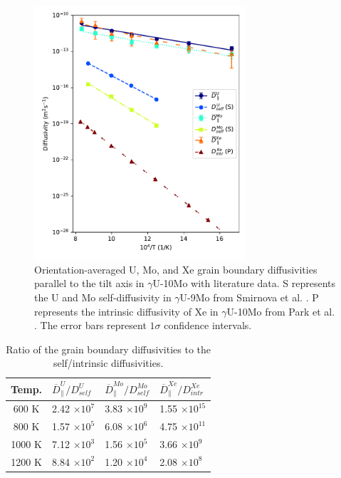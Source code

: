 \documentclass{elsarticle}
\providecommand{\DIFadd}[1]{{\protect\color{blue} \sf #1}} %
\providecommand{\DIFaddFL}[1]{\DIFadd{#1}} %
\providecommand{\DIFaddbeginFL}{} %
\providecommand{\DIFaddendFL}{} %
\begin{document}
\begin{figure}[!ht]
\centering
\includegraphics[width=0.70\textwidth]{newLitComp.pdf}
\caption{Orientation-averaged U, Mo, and Xe grain boundary diffusivities parallel to the tilt axis in $\gamma$U-10Mo with literature data. S represents the U and Mo self-diffusivity in $\gamma$U-9Mo from Smirnova et al. \cite{smirnova2015}. P represents the intrinsic diffusivity of Xe in $\gamma$U-10Mo from Park et al. \cite{park2023}. \DIFaddbeginFL \DIFaddFL{The error bars represent $1\sigma$ confidence intervals.}\DIFaddendFL }
\label{fig:umoxe}
\end{figure}

\begin{table}[!ht]
\centering
\caption{Ratio of the grain boundary diffusivities to the self/intrinsic diffusivities.}
\label{tab:enhance}
\begin{tabular}{clll}
\toprule
Temp.  & $\overline{D}^U_{\parallel}/D^U_{self}$
       & $\overline{D}^{Mo}_{\parallel}/D^{Mo}_{self}$
       & $\overline{D}^{Xe}_{\parallel}/D^{Xe}_{intr}$ \\
\midrule
600 K  & 2.42 $\times 10^7$ & 3.83 $\times 10^9$ & 1.55 $\times 10^{15}$ \\
800 K  & 1.57 $\times 10^5$ & 6.08 $\times 10^6$ & 4.75 $\times 10^{11}$ \\
1000 K & 7.12 $\times 10^3$ & 1.56 $\times 10^5$ & 3.66 $\times 10^9$  \\
1200 K & 8.84 $\times 10^2$ & 1.20 $\times 10^4$ & 2.08 $\times 10^8$  \\
\bottomrule
\end{tabular}
\end{table}
\end{document}
